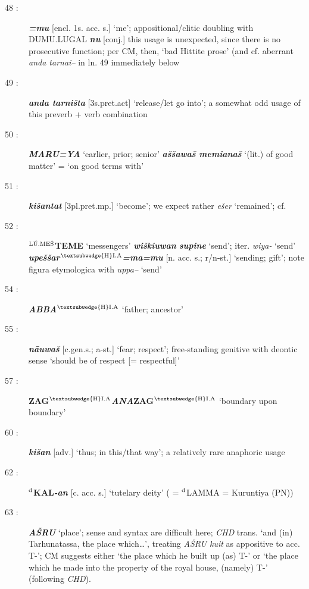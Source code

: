 \documentclass[10pt]{article}
\newcommand{\supersc}[1]{$^{\textrm{\scriptsize{#1}}}$}  	%
\newcommand{\bit}[1]{\textbf{\textit{#1}}}				%
\newcommand{\p}[1]{{\tiny[{#1}]}}					%
\newcommand{\hith}{\textsubwedge{h}}
\newcommand{\Hith}{\textsubwedge{H}}
\newcommand{\hpl}{\supersc{{\Hith}I.A}}
\newcommand{\men}{\supersc{L\'U.ME\v{S}}}
\renewcommand{\.}[1]{\textsubdot{#1}}
\begin{document}
\begin{description}
\item[48 :] \bit{=mu} \p{encl. 1s. acc. s.} `me'; appositional/clitic doubling with DUMU.LUGAL \bit{nu} \p{conj.} this usage is unexpected, since there is no prosecutive function; per CM, then, `bad Hittite prose' (and cf. aberrant \textit{anda tarnai--} in ln. 49 immediately below

\item[49 :] \bit{anda tarni\v{s}ta} \p{3s.pret.act} `release/let go into'; a somewhat odd usage of this preverb + verb combination

\item[50 :] \bit{MA{\Hith}RU=YA} `earlier, prior; senior' \bit{a\v{s}\v{s}awa\v{s} memiana\v{s}} `(lit.) of good matter' = `on good terms with'

\item[51 :] \bit{ki\v{s}antat} \p{3pl.pret.mp.} `become'; we expect rather \textit{e\v{s}er} `remained'; cf. \citet{vandenhout1997hattusili}

\item[52 :] \textbf{{\men}TEME} `messengers' \bit{wi\v{s}kiuwan} \bit{supine} `send'; iter. \textit{wiya-} `send' \bit{upe\v{s}\v{s}ar}\textbf{\hpl}\bit{=ma=mu} \p{n. acc. s.; r/n-st.} `sending; gift'; note figura etymologica with  \textit{uppa--} `send'

\item[54 :] \bit{ABBA}\textbf{\hpl} `father; ancestor'

\item[55 :] \bit{n\=a{\hith}uwa\v{s}} \p{c.gen.s.; a-st.} `fear; respect'; free-standing genitive with deontic sense `should be of respect [= respectful]'

\item[57 :] \textbf{ZAG\hpl}\bit{ANA}\textbf{ZAG\hpl} `boundary upon boundary' 

\item[60 :] \bit{ki\v{s}an} \p{adv.} `thus; in this/that way'; a relatively rare anaphoric usage

\item[62 :] \textbf{\supersc{d}KAL}\bit{-an} \p{c. acc. s.} `tutelary deity' ( = \supersc{d}LAMMA = Kuruntiya (PN))

\item[63 :] \bit{A\v{S}RU} `place'; sense and syntax are difficult here; \textit{CHD} trans. `and (in) Tarhunatassa, the place which{\ldots}', treating \textit{A\v{S}RU kuit} as appositive to acc. T-'; CM suggests either `the place which he built up (as) T-' \citep[following[29]{otten1981hattusili} or `the place which he made into the property of the royal house, (namely) T-' (following \textit{CHD}).


\end{description}
\end{document}
